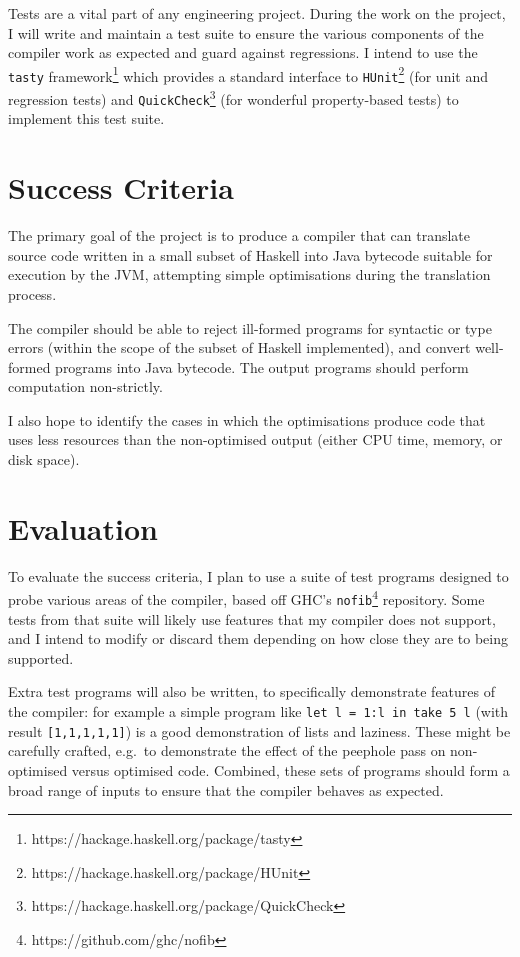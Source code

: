\documentclass[12pt]{article}
\newcommand\haskell[1]{\texttt{#1}}
\newcommand\monospace[1]{\texttt{#1}}
\begin{document}
Tests are a vital part of any engineering project. During the work on the project, I will write and maintain a test
suite to ensure the various components of the compiler work as expected and guard against regressions. I intend to use
the \monospace{tasty} framework\footnote{https://hackage.haskell.org/package/tasty} which provides a standard interface
to \monospace{HUnit}\footnote{https://hackage.haskell.org/package/HUnit} (for unit and regression tests) and
\monospace{QuickCheck}\footnote{https://hackage.haskell.org/package/QuickCheck} (for wonderful property-based tests) to
implement this test suite.

\section*{Success Criteria}

The primary goal of the project is to produce a compiler that can translate source code written in a small subset of
Haskell into Java bytecode suitable for execution by the JVM, attempting simple optimisations during the translation
process.

The compiler should be able to reject ill-formed programs for syntactic or type errors (within the scope of the subset
of Haskell implemented), and convert well-formed programs into Java bytecode. The output programs should perform
computation non-strictly.

I also hope to identify the cases in which the optimisations produce code that uses less resources than the
non-optimised output (either CPU time, memory, or disk space).

\section*{Evaluation}

To evaluate the success criteria, I plan to use a suite of test programs designed to probe various areas of the
compiler, based off GHC's \monospace{nofib}\footnote{https://github.com/ghc/nofib} repository. Some tests from that
suite will likely use features that my compiler does not support, and I intend to modify or discard them depending on
how close they are to being supported.

Extra test programs will also be written, to specifically demonstrate features of the compiler: for example a simple
program like \haskell{let l = 1:l in take 5 l} (with result \haskell{[1,1,1,1,1]}) is a good demonstration of lists and
laziness. These might be carefully crafted, e.g.\ to demonstrate the effect of the peephole pass on non-optimised versus
optimised code. Combined, these sets of programs should form a broad range of inputs to ensure that the compiler behaves
as expected.
\end{document}
